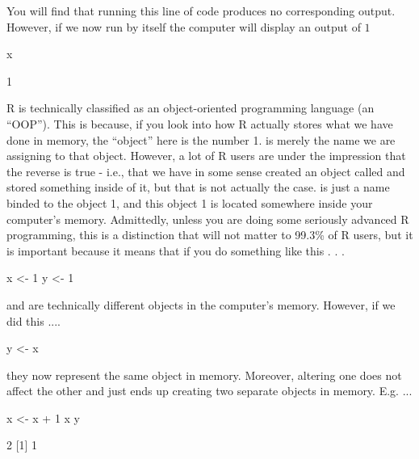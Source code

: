 \vspace{1em}

You will find that running this line of code produces no corresponding output.  However, if we now run  by itself the computer will display an output of $1$

\begin{inR}
x
\end{inR}

\begin{outR}
[1] 1
\end{outR}

R is technically classified as an object-oriented programming language (an ``OOP''). This is because, if you look into how R actually stores what we have done in memory, the ``object'' here is the number 1.   is merely the name we are assigning to that object. However, a lot of R users are under the impression that the reverse is true - i.e., that we have in some sense created an object called  and stored something inside of it, but that is not actually the case.  is just a name binded to the object 1, and this object 1 is located somewhere inside your computer's memory. Admittedly, unless you are doing some seriously advanced R programming, this is a distinction that will not matter to 99.3\% of R users, but it is important because it means that if you do something like this . . . 

\begin{inR}
x <- 1
y <- 1
\end{inR}

\vspace{1em}

\noindent {} and  are technically different objects in the computer's memory.  However, if we did this ....

\begin{inR}
y <- x
\end{inR}

\vspace{1em}

\noindent they now represent the same object in memory. Moreover, altering one does not affect the other and just ends up creating two separate objects in memory. E.g. ...

\begin{inR}
x <- x + 1
x
y
\end{inR}

\begin{outR}
[1] 2
[1] 1
\end{outR}

